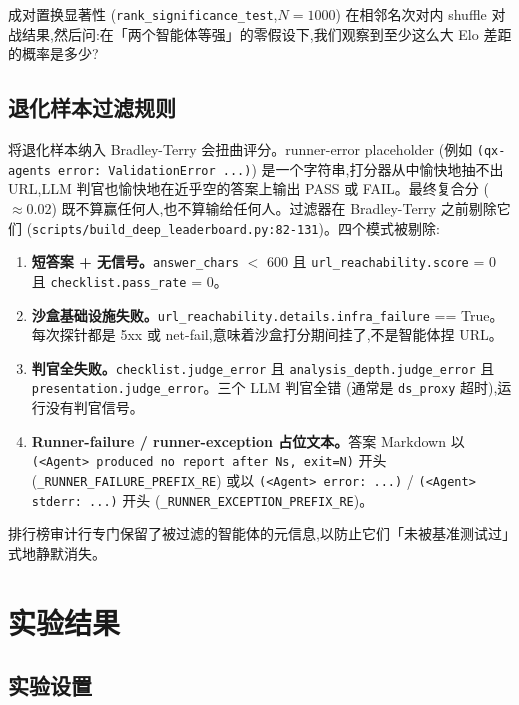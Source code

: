 \documentclass[UTF8,a4paper,12pt,oneside]{ctexart}
\begin{document}
成对置换显著性 (\texttt{rank\_significance\_test},\(N = 1000\)) 在相邻名次对内 shuffle 对战结果,然后问:在「两个智能体等强」的零假设下,我们观察到至少这么大 Elo 差距的概率是多少?

\subsection{退化样本过滤规则}

将退化样本纳入 Bradley-Terry 会扭曲评分。runner-error placeholder (例如 \texttt{(qx-agents error: ValidationError ...)}) 是一个字符串,打分器从中愉快地抽不出 URL,LLM 判官也愉快地在近乎空的答案上输出 PASS 或 FAIL。最终复合分 (\(\approx 0.02\)) 既不算赢任何人,也不算输给任何人。过滤器在 Bradley-Terry 之前剔除它们 (\texttt{scripts/build\_deep\_leaderboard.py:82-131})。四个模式被剔除:

\begin{enumerate}[leftmargin=2em]
\item \textbf{短答案 + 无信号。}\texttt{answer\_chars} \(<\) 600 且 \texttt{url\_reachability.score} = 0 且 \texttt{checklist.pass\_rate} = 0。
\item \textbf{沙盒基础设施失败。}\texttt{url\_reachability.details.infra\_failure} == True。每次探针都是 5xx 或 net-fail,意味着沙盒打分期间挂了,不是智能体捏 URL。
\item \textbf{判官全失败。}\texttt{checklist.judge\_error} 且 \texttt{analysis\_depth.judge\_error} 且 \texttt{presentation.judge\_error}。三个 LLM 判官全错 (通常是 \texttt{ds\_proxy} 超时),运行没有判官信号。
\item \textbf{Runner-failure / runner-exception 占位文本。}答案 Markdown 以 \texttt{(<Agent> produced no report after Ns, exit=N)} 开头 (\texttt{\_RUNNER\_FAILURE\_PREFIX\_RE}) 或以 \texttt{(<Agent> error: ...)} / \texttt{(<Agent> stderr: ...)} 开头 (\texttt{\_RUNNER\_EXCEPTION\_PREFIX\_RE})。
\end{enumerate}

排行榜审计行专门保留了被过滤的智能体的元信息,以防止它们「未被基准测试过」式地静默消失。

\section{实验结果}

\subsection{实验设置}
\end{document}
